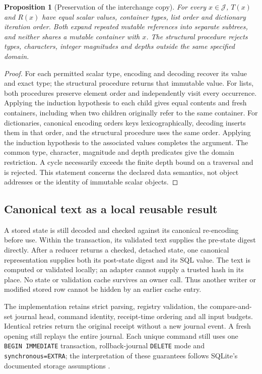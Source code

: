 \documentclass[11pt,a4paper]{article}
\newtheorem{proposition}[theorem]{Proposition}
\theoremstyle{definition}\newtheorem{definition}[theorem]{Definition}
\begin{document}
\begin{proposition}[Preservation of the interchange copy]\label{prop:typedcopy}
For every $x\in\mathcal J$, $T(x)$ and $R(x)$ have equal scalar values, container types, list order and dictionary iteration order. Both expand repeated mutable references into separate subtrees, and neither shares a mutable container with $x$. The structural procedure rejects types, characters, integer magnitudes and depths outside the same specified domain.
\end{proposition}
\begin{proof}
For each permitted scalar type, encoding and decoding recover its value and exact type; the structural procedure returns that immutable value. For lists, both procedures preserve element order and independently visit every occurrence. Applying the induction hypothesis to each child gives equal contents and fresh containers, including when two children originally refer to the same container. For dictionaries, canonical encoding orders keys lexicographically, decoding inserts them in that order, and the structural procedure uses the same order. Applying the induction hypothesis to the associated values completes the argument. The common type, character, magnitude and depth predicates give the domain restriction. A cycle necessarily exceeds the finite depth bound on a traversal and is rejected. This statement concerns the declared data semantics, not object addresses or the identity of immutable scalar objects.
\end{proof}

\subsection{Canonical text as a local reusable result}
A stored state is still decoded and checked against its canonical re-encoding before use. Within the transaction, its validated text supplies the pre-state digest directly. After a reducer returns a checked, detached state, one canonical representation supplies both its post-state digest and its SQL value. The text is computed or validated locally; an adapter cannot supply a trusted hash in its place. No state or validation cache survives an owner call. Thus another writer or modified stored row cannot be hidden by an earlier cache entry.

The implementation retains strict parsing, registry validation, the compare-and-set journal head, command identity, receipt-time ordering and all input budgets. Identical retries return the original receipt without a new journal event. A fresh opening still replays the entire journal. Each unique command still uses one \texttt{BEGIN IMMEDIATE} transaction, rollback-journal \texttt{DELETE} mode and \texttt{synchronous=EXTRA}; the interpretation of these guarantees follows SQLite's documented storage assumptions \cite{sqliteatomic,sqlitepragmas}.
\end{document}
